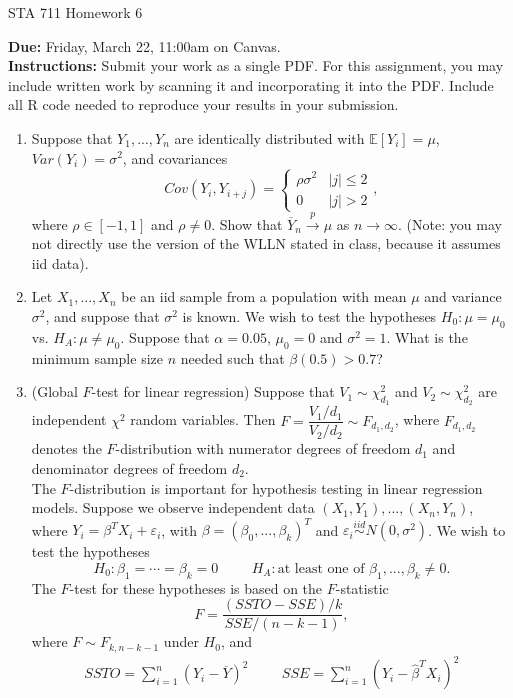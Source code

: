 \documentclass[11pt]{article}
\begin{document}
\begin{center}
\Large
STA 711 Homework 6\\
\normalsize
\vspace{5mm}
\end{center}

\noindent \textbf{Due:} Friday, March 22, 11:00am on Canvas.\\ 

\noindent \textbf{Instructions:} Submit your work as a single PDF. For this assignment, you may include written work by scanning it and incorporating it into the PDF. Include all R code needed to reproduce your results in your submission.


\begin{enumerate}
\item Suppose that $Y_1,...,Y_n$ are identically distributed with $\mathbb{E}[Y_i] = \mu$, $Var(Y_i) = \sigma^2$, and covariances
$$Cov(Y_i, Y_{i+j}) = \begin{cases} 
\rho \sigma^2 & |j| \leq 2 \\
0 & |j| > 2
\end{cases},$$
where $\rho \in [-1, 1]$ and $\rho \neq 0$. Show that $\overline{Y}_n \overset{p}{\to} \mu$ as $n \to \infty$. (Note: you may not directly use the version of the WLLN stated in class, because it assumes iid data).

\item Let $X_1,...,X_n$ be an iid sample from a population with mean $\mu$ and variance $\sigma^2$, and suppose that $\sigma^2$ is known. We wish to test the hypotheses $H_0: \mu = \mu_0$ vs. $H_A: \mu \neq \mu_0$. Suppose that $\alpha = 0.05$, $\mu_0 = 0$ and $\sigma^2 = 1$. What is the minimum sample size $n$ needed such that $\beta(0.5) > 0.7$?

\item (Global $F$-test for linear regression) Suppose that $V_1 \sim \chi^2_{d_1}$ and $V_2 \sim \chi^2_{d_2}$ are independent $\chi^2$ random variables. Then $F = \dfrac{V_1/d_1}{V_2/d_2} \sim F_{d_1, d_2}$, where $F_{d_1, d_2}$ denotes the $F$-distribution with numerator degrees of freedom $d_1$ and denominator degrees of freedom $d_2$.\\

The $F$-distribution is important for hypothesis testing in linear regression models. Suppose we observe independent data $(X_1, Y_1),...,(X_n, Y_n)$, where $Y_i = \beta^T X_i + \varepsilon_i$, with $\beta = (\beta_0, ..., \beta_k)^T$ and $\varepsilon_i \overset{iid}{\sim} N(0, \sigma^2)$. We wish to test the hypotheses
$$H_0: \beta_1 = \cdots = \beta_k = 0 \hspace{1cm} H_A: \text{at least one of } \beta_1,...,\beta_k \neq 0.$$
The $F$-test for these hypotheses is based on the $F$-statistic
$$F = \dfrac{(SSTO - SSE)/k}{SSE/(n - k - 1)},$$
where $F \sim F_{k, n-k-1}$ under $H_0$, and
\begin{align*}
SSTO = \sum \limits_{i=1}^n (Y_i - \overline{Y})^2 \hspace{1cm} SSE = \sum \limits_{i=1}^n (Y_i - \widehat{\beta}^T X_i)^2
\end{align*}


\end{enumerate}
\end{document}
